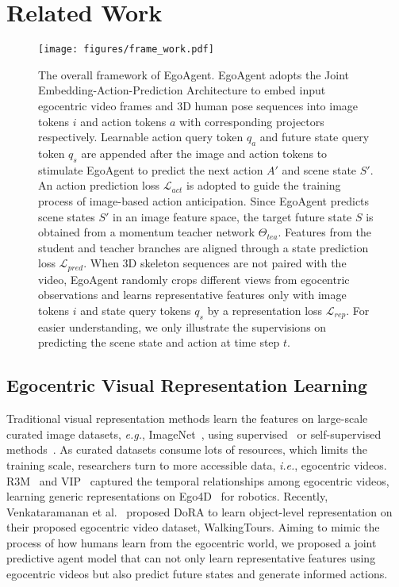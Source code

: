 \section{Related Work}
\label{sec:related}

\begin{figure*}[th]
    \centering
    \texttt{[image: figures/frame\_work.pdf]}
    \vspace{-1.5em}
    \caption{The overall framework of EgoAgent. EgoAgent adopts the Joint Embedding-Action-Prediction Architecture to embed input egocentric video frames and 3D human pose sequences into image tokens $i$ and action tokens $a$ with corresponding projectors respectively. Learnable action query token $q_a$ and future state query token $q_s$ are appended after the image and action tokens to stimulate EgoAgent to predict the next action $A'$ and scene state $S'$. An action prediction loss $\mathcal{L}_{act}$ is adopted to guide the training process of image-based action anticipation. Since EgoAgent predicts scene states $S'$ in an image feature space, the target future state $S$ is obtained from a momentum teacher network $\Theta_{tea}$. Features from the student and teacher branches are aligned through a state prediction loss $\mathcal{L}_{pred}$. When 3D skeleton sequences are not paired with the video, EgoAgent randomly crops different views from egocentric observations and learns representative features only with image tokens $i$ and state query tokens $q_s$ by a representation loss $\mathcal{L}_{rep}$. For easier understanding, we only illustrate the supervisions on predicting the scene state and action at time step $t$. }
    \label{fig:framework}
    \vspace{-0.5em}
\end{figure*}

\subsection{Egocentric Visual Representation Learning}
Traditional visual representation methods learn the features on large-scale curated image datasets, \emph{e.g.}, ImageNet~\cite{deng2009imagenet}, using supervised~\cite{he2016deep,khosla2020supervised,wang2022revisiting} or self-supervised methods~\cite{he2020momentum,caron2021emerging,chen2020simple}. 
As curated datasets consume lots of resources, which limits the training scale, researchers turn to more accessible data, \emph{i.e.}, egocentric videos. R3M~\cite{nair2022r3m} and VIP~\cite{ma2022vip} captured the temporal relationships among egocentric videos, learning generic representations on Ego4D~\cite{grauman2022ego4d} for robotics. Recently, Venkataramanan et al.~\cite{venkataramanan2023imagenet} proposed DoRA to learn object-level representation on their proposed egocentric video dataset, WalkingTours. Aiming to mimic the process of how humans learn from the egocentric world, we proposed a joint predictive agent model that can not only learn representative features using egocentric videos but also predict future states and generate informed actions.

